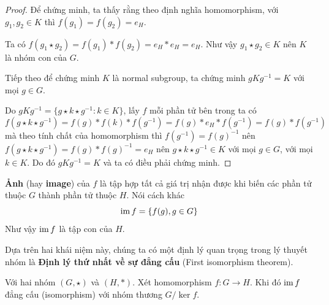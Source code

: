 \begin{proof}
    Để chứng minh, ta thấy rằng theo định nghĩa homomorphism, với $g_1, g_2 \in K$ thì $f(g_1) = f(g_2) = e_H$.
    
    Ta có $f(g_1 \star g_2) = f(g_1) * f(g_2) = e_H * e_H = e_H$. Như vậy
    $g_1 \star g_2 \in K$ nên $K$ là nhóm con của $G$.
    
    Tiếp theo để chứng minh $K$ là normal subgroup, ta chứng minh
    $g K g^{-1} = K$ với mọi $g \in G$.

    Do $g K g^{-1} = \{ g \star k \star g^{-1} : k \in K \}$, lấy $f$ mỗi phần tử bên trong ta có 
    \[f(g \star k \star g^{-1}) = f(g) * f(k) * f(g^{-1}) = 
    f(g) * e_H * f(g^{-1}) = f(g) * f(g^{-1})\]
    mà theo tính chất của homomorphism thì $f(g^{-1}) = f(g)^{-1}$ nên $f(g \star k \star g^{-1}) = f(g) * f(g)^{-1} = e_H$ nên $g \star k \star g^{-1} \in K$ với mọi $g \in G$, với mọi $k \in K$. Do đó $g K g^{-1} = K$ và ta có điều phải chứng minh.
\end{proof}

\begin{definition}
    \textbf{Ảnh} (hay \textbf{image}) của $f$ là tập hợp tất cả giá trị nhận được khi biến các phần tử thuộc $G$ thành phần tử thuộc $H$. Nói cách khác
    \begin{equation}
        \operatorname{im} f = \{ f(g), g \in G \}
    \end{equation}
    Như vậy $\operatorname{im} f$ là tập con của $H$.
\end{definition}

Dựa trên hai khái niệm này, chúng ta có một định lý quan trọng trong lý
thuyết nhóm là \textbf{Định lý thứ nhất về sự đẳng cấu} (First isomorphism theorem).

\begin{theorem}
    Với hai nhóm $(G, \star)$ và $(H, *)$. Xét homomorphism $f: G \to H$. Khi đó $\operatorname{im} f$ đẳng cấu (isomorphism) với nhóm thương $G / \ker f$.
\end{theorem}

